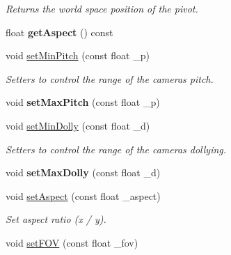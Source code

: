 \begin{DoxyCompactItemize}
\begin{DoxyCompactList}\small\item\em Returns the world space position of the pivot. \end{DoxyCompactList}\item 
\hypertarget{class_camera_a07c785e3973493dbcb278f2a63e8cbdf}{}float {\bfseries get\+Aspect} () const \label{class_camera_a07c785e3973493dbcb278f2a63e8cbdf}

\item 
\hypertarget{class_camera_af1dfad757cc3a4f0b0e238521e178cc8}{}void \hyperlink{class_camera_af1dfad757cc3a4f0b0e238521e178cc8}{set\+Min\+Pitch} (const float \+\_\+p)\label{class_camera_af1dfad757cc3a4f0b0e238521e178cc8}

\begin{DoxyCompactList}\small\item\em Setters to control the range of the cameras pitch. \end{DoxyCompactList}\item 
\hypertarget{class_camera_ae136c14bb2772effb2960fefb712a921}{}void {\bfseries set\+Max\+Pitch} (const float \+\_\+p)\label{class_camera_ae136c14bb2772effb2960fefb712a921}

\item 
\hypertarget{class_camera_ae4b323a7d183493534b704926417e412}{}void \hyperlink{class_camera_ae4b323a7d183493534b704926417e412}{set\+Min\+Dolly} (const float \+\_\+d)\label{class_camera_ae4b323a7d183493534b704926417e412}

\begin{DoxyCompactList}\small\item\em Setters to control the range of the cameras dollying. \end{DoxyCompactList}\item 
\hypertarget{class_camera_aa7c90ca5881c4d42b8bc49fb7ddbe674}{}void {\bfseries set\+Max\+Dolly} (const float \+\_\+d)\label{class_camera_aa7c90ca5881c4d42b8bc49fb7ddbe674}

\item 
\hypertarget{class_camera_aba54cec293bc594b933a110a2e8094f3}{}void \hyperlink{class_camera_aba54cec293bc594b933a110a2e8094f3}{set\+Aspect} (const float \+\_\+aspect)\label{class_camera_aba54cec293bc594b933a110a2e8094f3}

\begin{DoxyCompactList}\small\item\em Set aspect ratio (x / y). \end{DoxyCompactList}\item 
\hypertarget{class_camera_add3fbf94b22349e84d19b699d9113276}{}void \hyperlink{class_camera_add3fbf94b22349e84d19b699d9113276}{set\+F\+O\+V} (const float \+\_\+fov)\label{class_camera_add3fbf94b22349e84d19b699d9113276}


\end{DoxyCompactItemize}

